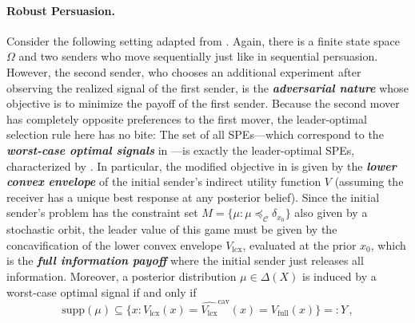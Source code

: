 \documentclass[12pt,letterpaper]{article}
\newenvironment{original}{\color{black}}{}
\newcommand*\supp{\mathrm{supp}}
\theoremstyle{plain}
\theoremstyle{definition}
\theoremstyle{remark}
\newcommand{\C}{\mathcal{C}}
\theoremstyle{definition}
\begin{document}
\paragraph{Robust Persuasion.}\hspace{-2mm}
\begin{original}
Consider the following setting adapted from \citet{DworczakPavan2022RobustPersuasion}. Again, there is a finite state space $\Omega$ and two senders who move sequentially just like in sequential persuasion. However, the second sender, who chooses an additional experiment after observing the realized signal of the first sender, is the \textit{\textbf{adversarial nature}} whose objective is to minimize the payoff of the first sender. Because the second mover has completely opposite preferences to the first mover, the leader-optimal selection rule here has no bite: The set of all SPEs---which correspond to the \textit{\textbf{worst-case optimal signals}} in \citet{DworczakPavan2022RobustPersuasion}---is exactly the leader-optimal SPEs, characterized by . In particular, the modified objective in  is given by the \textit{\textbf{lower convex envelope}} of the initial sender's indirect utility function $V$ (assuming the receiver has a unique best response at any posterior belief). Since the initial sender's problem has the constraint set $M = \{\mu: \mu \preceq_\C \delta_{x_0}\}$ also given by a stochastic orbit, the leader value of this game must be given by the concavification of the lower convex envelope $V_{\text{lcx}}$, evaluated at the prior $x_0$, which is the \textit{\textbf{full information payoff}} where the initial sender just releases all information. Moreover, a posterior distribution $\mu \in \Delta(X)$ is induced by a worst-case optimal signal if and only if \[\supp(\mu) \subseteq \Big\{x:  V_{\text{lcx}}(x) = \widehat{V_{\text{lcx}}}^{\text{cav}}(x)  = V_{\text{full}}(x)\Big\} =: Y\,,\]

\end{original}
\end{document}
